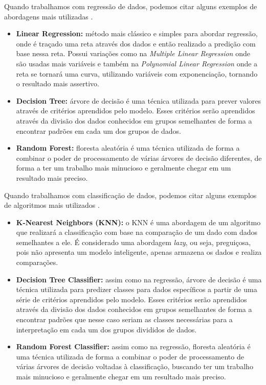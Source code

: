 Quando trabalhamos com regressão de dados, podemos citar alguns exemplos de abordagens mais utilizadas \cite{machineLearningTensorFlow}.
\begin{itemize}
    \item \textbf{Linear Regression:} método mais clássico e simples para abordar regressão, onde é traçado uma reta através dos dados e então realizado a predição com base nessa reta. Possui variações como na \emph{Multiple Linear Regression} onde são usadas mais variáveis e também na \emph{Polynomial Linear Regression} onde a reta se tornará uma curva, utilizando variáveis com exponenciação, tornando o resultado mais assertivo.
    \item \textbf{Decision Tree:} árvore de decisão é uma técnica utilizada para prever valores através de critérios aprendidos pelo modelo. Esses critérios serão aprendidos através da divisão dos dados conhecidos em grupos semelhantes de forma a encontrar padrões em cada um dos grupos de dados.
    \item \textbf{Random Forest:} floresta aleatória é uma técnica utilizada de forma a combinar o poder de processamento de várias árvores de decisão diferentes, de forma a ter um trabalho mais minucioso e geralmente chegar em um resultado mais preciso.
\end{itemize}

Quando trabalhamos com classificação de dados, podemos citar alguns exemplos de algoritmos mais utilizados \cite{machineLearningPython}.
\begin{itemize}
    \item \textbf{K-Nearest Neighbors (KNN):} o KNN é uma abordagem de um algoritmo que realizará a classificação com base na comparação de um dado com dados semelhantes a ele. É considerado uma abordagem \emph{lazy}, ou seja, preguiçosa, pois não apresenta um modelo inteligente, apenas armazena os dados e realiza comparações.
    \item \textbf{Decision Tree Classifier:} assim como na regressão, árvore de decisão é uma técnica utilizada para predizer classes para dados específicos a partir de uma série de critérios aprendidos pelo modelo. Esses critérios serão aprendidos através da divisão dos dados conhecidos em grupos semelhantes de forma a encontrar padrões que nesse caso seriam as classes necessárias para a interpretação em cada um dos grupos divididos de dados.
    \item \textbf{Random Forest Classifier:} assim como na regressão, floresta aleatória é uma técnica utilizada de forma a combinar o poder de processamento de várias árvores de decisão voltadas à classificação, buscando ter um trabalho mais minucioso e geralmente chegar em um resultado mais preciso.
\end{itemize}

